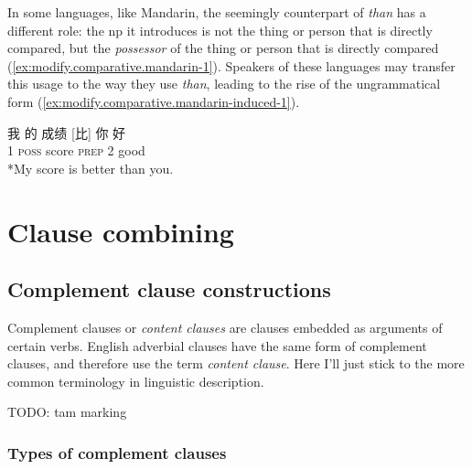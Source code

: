 \documentclass[UTF8, a4paper, oneside, scheme=plain, 12pt]{ctexbook}
\newcommand*{\term}[1]{\emph{#1}}
\newcommand{\form}[1]{\emph{#1}}
\newcommand{\category}[1]{\textsc{#1}}
\begin{document}
In some languages, like Mandarin, 
the seemingly counterpart of \form{than} 
has a different role: 
the \acs{np} it introduces is not the thing or person that is directly compared, 
but the \emph{possessor} of the thing or person that is directly compared
(\ref{ex:modify.comparative.mandarin-1}).
Speakers of these languages may transfer this usage 
to the way they use \form{than},
leading to the rise of the ungrammatical form (\ref{ex:modify.comparative.mandarin-induced-1}).

\begin{exe}
    \ex\label{ex:modify.comparative.mandarin-1} \gll 我 的 成绩 [比] 你 好 \\
    1 \category{poss} score \category{prep} 2 good \\
    \ex\label{ex:modify.comparative.mandarin-induced-1} *My score is better than you.
\end{exe}


\chapter{Clause combining}\label{chap:clause-combining}

\section{Complement clause constructions}\label{sec:clause-combining.complement-clause}

Complement clauses or \term{content clauses} \citep{cgel} are clauses embedded as arguments of certain verbs.
English adverbial clauses have the same form of complement clauses,
and therefore \citet{cgel} use the term \term{content clause}.
Here I'll just stick to the more common terminology in linguistic description.

TODO: \ac{tam} marking

\subsection{Types of complement clauses}
\end{document}
